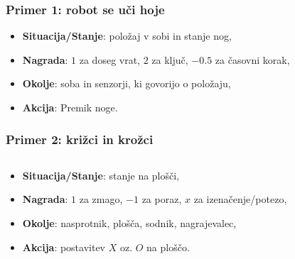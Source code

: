 \documentclass{beamer}    %
\begin{document}
\begin{frame}
    \frametitle{Primer 1: robot se uči hoje}
    \begin{itemize}
        \item \textbf{Situacija/Stanje}: položaj v sobi in stanje nog,
        \item \textbf{Nagrada}: $1$ za doseg vrat, $2$ za ključ, $-0.5$ za časovni korak,
        \item \textbf{Okolje}: soba in senzorji, ki govorijo o položaju,
        \item \textbf{Akcija}: Premik noge.
    \end{itemize}
\end{frame}


\begin{frame}[fragile]
    \frametitle{Primer 2: križci in krožci}
    \begin{columns}[T] %
    \begin{column}{.48\textwidth}
    
    \begin{itemize}
        \item \textbf{Situacija/Stanje}: stanje na plošči,
        \item \textbf{Nagrada}: $1$ za zmago, $-1$ za poraz, $x$ za izenačenje/potezo,
        \item \textbf{Okolje}: nasprotnik, plošča, sodnik, nagrajevalec,
        \item \textbf{Akcija}: postavitev $X$ oz. $O$ na ploščo.
    \end{itemize}

    \end{column}%
    \hfill%
    \begin{column}{.48\textwidth}
    

    \end{column}%
    \end{columns}
    \end{frame}
\end{document}
